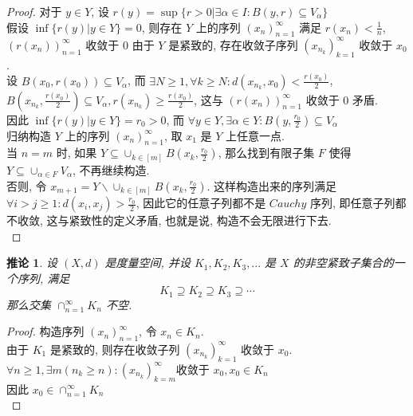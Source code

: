 \documentclass[12pt, a4paper, oneside]{ctexart}
\newtheorem{theorem}{定理}[section]
\newtheorem{corollary}[theorem]{推论}
\begin{document}
\begin{proof}
    对于 $y\in Y$, 设 $r(y)=\sup\{r>0|\exists \alpha\in I:B(y, r)\subseteq V_{\alpha}\}$\\
    假设 $\inf\{r(y)|y\in Y\}=0$, 则存在 $Y$ 上的序列 $(x_n)_{n=1}^{\infty}$ 满足 $r(x_n)<\frac1n$, $(r(x_n))_{n=1}^{\infty}$ 收敛于 $0$
    由于 $Y$ 是紧致的, 存在收敛子序列 $(x_{n_k})_{k=1}^{\infty}$ 收敛于 $x_0$.\\
    设 $B(x_0,r(x_0))\subseteq V_{\alpha}$, 而 $\exists N \geq 1, \forall k\geq N: d(x_{n_k}, x_0) < \frac{r(x_0)}{2}$, $B(x_{n_k}, \frac{r(x_0)}{2})\subseteq V_{\alpha}, r(x_{n_k})\geq \frac{r(x_0)}{2}$,
    这与 $(r(x_n))_{n=1}^{\infty}$ 收敛于 $0$ 矛盾.\\
    因此 $\inf\{r(y)|y\in Y\}=r_0>0$, 而 $\forall y\in Y, \exists \alpha\in Y : B(y, \frac{r_0}{2})\subseteq V_{\alpha}$\\
    归纳构造 $Y$ 上的序列 $(x_n)_{n=1}^{\infty}$, 取 $x_1$ 是 $Y$ 上任意一点.\\
    当 $n=m$ 时, 如果 $Y\subseteq \cup_{k\in[m]} B(x_k, \frac{r_0}{2})$, 那么找到有限子集 $F$ 使得 $Y\subseteq \cup_{\alpha\in F}V_{\alpha}$, 不再继续构造.\\
    否则, 令 $x_{m+1}=Y\backslash \cup_{k\in[m]} B(x_k, \frac{r_0}{2})$.
    这样构造出来的序列满足 $\forall i > j\geq 1:d(x_i, x_j)>\frac{r_0}{2}$, 因此它的任意子列都不是 $Cauchy$ 序列, 即任意子列都不收敛, 这与紧致性的定义矛盾, 也就是说, 构造不会无限进行下去.\\
\end{proof}

\begin{corollary}
    设 $(X, d)$ 是度量空间, 并设 $K_1,K_2,K_3,...$ 是 $X$ 的非空紧致子集合的一个序列, 满足
    $$
        K_1 \supseteq K_2 \supseteq K_3 \supseteq \cdots
    $$
    那么交集 $\cap_{n=1}^{\infty}K_n$ 不空.
\end{corollary}

\begin{proof}
    构造序列 $(x_n)_{n=1}^{\infty}$, 令 $x_n\in K_n$.\\
    由于 $K_1$ 是紧致的, 则存在收敛子列 $(x_{n_k})_{k=1}^{\infty}$ 收敛于 $x_0$.\\
    $\forall n\geq 1, \exists m (n_k\geq n): (x_{n_k})_{k=m}^{\infty} \text{收敛于 } x_0, x_0\in K_n$\\
    因此 $x_0\in \cap_{n=1}^{\infty} K_n$\\
\end{proof}

\end{document}
